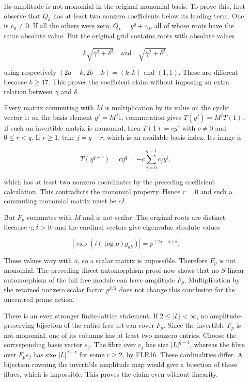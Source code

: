 \documentclass[11pt]{article}
\begin{document}
Its amplitude is not monomial in the original monomial basis. To prove this, first observe that \(Q_k\) has at least two nonzero coefficients below its leading term. One is \(c_0\ne0\). If all the others were zero, \(Q_k=y^q+c_0\), all of whose roots have the same absolute value. But the original grid contains roots with absolute values

\[
k\sqrt{\gamma^2+\delta^2}\quad\text{and}\quad
\sqrt{\gamma^2+\delta^2},
\tag{CR33}
\]

using respectively \((2a-k,2b-k)=(k,k)\) and \((1,1)\). These are different because \(k\ge17\). This proves the coefficient claim without imposing an extra relation between \(\gamma\) and \(\delta\).

Every matrix commuting with \(M\) is multiplication by its value on the cyclic vector \(1\): on the basis element \(y^j=M^j1\), commutation gives \(T(y^j)=M^jT(1)\). If such an invertible matrix is monomial, then \(T(1)=cy^r\) with \(c\ne0\) and \(0\le r<q\). If \(r\ge1\), take \(j=q-r\), which is an available basis index. Its image is

\[
T(y^{q-r})=cy^q=-c\sum_{j=0}^{q-1}c_jy^j,
\tag{CR34}
\]

which has at least two nonzero coordinates by the preceding coefficient calculation. This contradicts the monomial property. Hence \(r=0\) and such a commuting monomial matrix must be \(cI\).

But \(F_p\) commutes with \(M\) and is not scalar. The original roots are distinct because \(\gamma,\delta>0\), and the cardinal vectors give eigenvalue absolute values

\[
\left|\exp(i(\log p)y_{ab})\right|
   =p^{(2a-k)\delta}.
\tag{CR35}
\]

These values vary with \(a\), so a scalar matrix is impossible. Therefore \(F_p\) is not monomial. The preceding direct automorphism proof now shows that no \(S\)-linear automorphism of the full free module can have amplitude \(F_p\). Multiplication by the retained nonzero scalar factor \(p^{k/2}\) does not change this conclusion for the uncentred prime action.

There is an even stronger finite-lattice statement. If \(2\le|L|<\infty\), no amplitude-preserving bijection of the entire free set can cover \(F_p\). Since the invertible \(F_p\) is not monomial, one of its columns has at least two nonzero entries. Choose the corresponding basis vector \(e_j\). The fibre over \(e_j\) has size \(|L|^{q-1}\), whereas the fibre over \(F_pe_j\) has size \(|L|^{q-r}\) for some \(r\ge2\), by FLR16. These cardinalities differ. A bijection covering the invertible amplitude map would give a bijection of those fibres, which is impossible. This proves the claim even without linearity.
\end{document}
